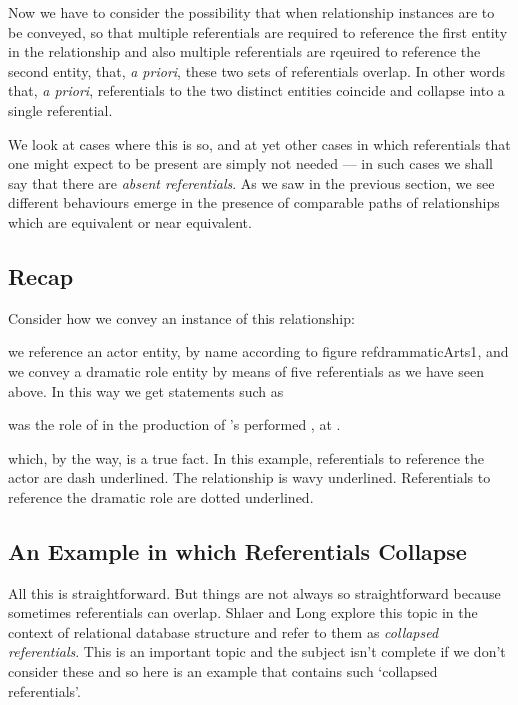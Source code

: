Now we have to consider the possibility that when relationship instances are to be conveyed, so that multiple referentials are required to reference the first entity in the relationship and also multiple referentials are rqeuired to reference the second entity, that, \textit{a priori}, these two sets of referentials overlap. 
In other words that, \textit{a priori}, referentials to the two distinct entities coincide and collapse into a single referential. 

We look at cases where this is so, and at yet other cases in which 
referentials that one might expect to be present are simply not needed --- in such cases we shall say that there are \textit{absent referentials}.
As we saw in the previous section, we see different behaviours emerge in the presence of comparable paths of relationships
which are equivalent or near equivalent.

\subsection {Recap}
Consider how we convey an instance of this relationship:
\begin{equation}

\end{equation}

we reference an actor entity, by name according to figure ref{drammaticArts1},
and we convey a dramatic role entity by means of five referentials as we have seen above.
In this way we get statements such as
\begin{erquote}

\parbox{9.0cm}{\linespread{1.5}\normalsize{} was  the role of  in the production of \mbox{'s}  performed \mbox{,} at .
}
\end{erquote}
which, by the way, is a true fact. 
In this example, referentials to reference the actor are dash underlined. The relationship is wavy underlined.
Referentials to reference the dramatic role are dotted underlined.
\subsection{An Example in which Referentials Collapse}
All this is straightforward. But things are not always so straightforward because sometimes referentials can overlap. 
Shlaer and Long explore this topic in the context of relational database structure and refer to them as \textit{collapsed referentials}. This is an important topic and the subject isn't complete if we don't 
consider these and so here is an example that contains such `collapsed referentials'.

